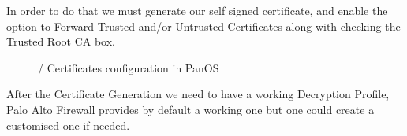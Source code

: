 In order to do that we must generate our self signed certificate, and enable the option to Forward Trusted and/or Untrusted Certificates along with checking the Trusted Root CA box.

\begin{figure}[!hb]
\centering
 \hspace{0.5cm}
 \caption{/ Certificates configuration in PanOS}\label{Certificates}
\end{figure}

\newpage

After the Certificate Generation we need to have a working Decryption Profile, Palo Alto Firewall provides by default a working one but one could create a customised one if needed.

